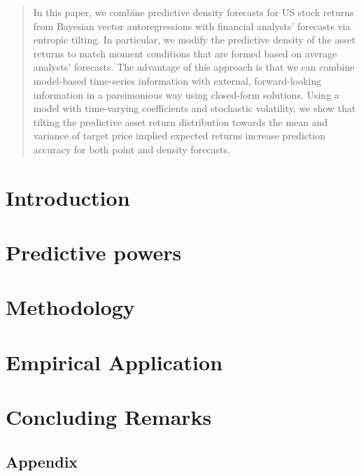 \documentclass[11pt,a4paper]{article}
\begin{document}
\begin{abstract}
	\noindent In this paper, we combine predictive density forecasts for US stock returns from Bayesian vector autoregressions with financial analysts' forecasts via entropic tilting. In particular, we modify the predictive density of the asset returns to match moment conditions that are formed based on average analysts' forecasts. The advantage of this approach is that we can combine model-based time-series information with external, forward-looking information in a parsimonious way using closed-form solutions. Using a model with time-varying coefficients and stochastic volatility, we show that tilting the predictive asset return distribution towards the mean and variance of target price implied expected returns  increase prediction accuracy for both point and density forecasts.
\end{abstract}
\thispagestyle{empty}
\newpage

\section{Introduction}
\label{sec:intro}


\section{Predictive powers}
\label{sec:literature}


\section{Methodology}
\label{sec:methodology}


\section{Empirical Application}
\label{sec:application}


\section{Concluding Remarks}
\label{sec:conclusions}

\newpage


%


{\setlength{\bibsep}{-0.00\baselineskip}

\newpage
}

\newpage
\begin{appendix}
\section{Appendix}
\label{sec:appendix}

\end{appendix}
\end{document}
